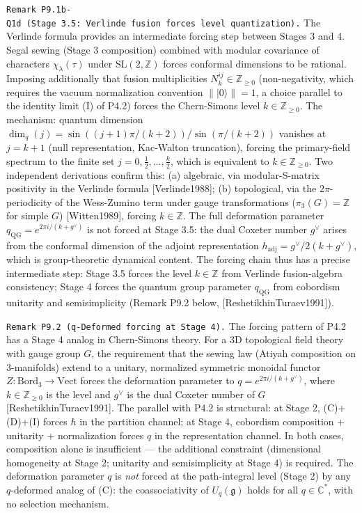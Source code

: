 \documentclass[
]{article}
\begin{document}
\texttt{Remark\ P9.1b-Q1d\ (Stage\ 3.5:\ Verlinde\ fusion\ forces\ level\ quantization).}
The Verlinde formula provides an intermediate forcing step between
Stages 3 and 4. Segal sewing (Stage 3 composition) combined with modular
covariance of characters \(\chi_\lambda(\tau)\) under
\(\mathrm{SL}(2,\mathbb{Z})\) forces conformal dimensions to be
rational. Imposing additionally that fusion multiplicities
\(N^{ij}_k \in \mathbb{Z}_{\geq 0}\) (non-negativity, which requires the
vacuum normalization convention \(\lVert\lvert 0\rangle\rVert = 1\), a
choice parallel to the identity limit (I) of P4.2) forces the
Chern-Simons level \(k \in \mathbb{Z}_{\geq 0}\). The mechanism: quantum
dimension \(\dim_q(j) = \sin((j+1)\pi/(k+2))/\sin(\pi/(k+2))\) vanishes
at \(j = k+1\) (null representation, Kac-Walton truncation), forcing the
primary-field spectrum to the finite set
\(j = 0, \tfrac{1}{2}, \ldots, \tfrac{k}{2}\), which is equivalent to
\(k \in \mathbb{Z}_{\geq 0}\). Two independent derivations confirm this:
(a) algebraic, via modular-S-matrix positivity in the Verlinde formula
{[}Verlinde1988{]}; (b) topological, via the \(2\pi\)-periodicity of the
Wess-Zumino term under gauge transformations (\(\pi_3(G) = \mathbb{Z}\)
for simple \(G\)) {[}Witten1989{]}, forcing \(k \in \mathbb{Z}\). The
full deformation parameter \(q_{\mathrm{QG}} = e^{2\pi i/(k+g^\vee)}\)
is not forced at Stage 3.5: the dual Coxeter number \(g^\vee\) arises
from the conformal dimension of the adjoint representation
\(h_{\mathrm{adj}} = g^\vee / 2(k+g^\vee)\), which is group-theoretic
dynamical content. The forcing chain thus has a precise intermediate
step: Stage 3.5 forces the level \(k \in \mathbb{Z}\) from Verlinde
fusion-algebra consistency; Stage 4 forces the quantum group parameter
\(q_{\mathrm{QG}}\) from cobordism unitarity and semisimplicity (Remark
P9.2 below, {[}ReshetikhinTuraev1991{]}).

\texttt{Remark\ P9.2\ (q-Deformed\ forcing\ at\ Stage\ 4).} The forcing
pattern of P4.2 has a Stage 4 analog in Chern-Simons theory. For a 3D
topological field theory with gauge group \(G\), the requirement that
the sewing law (Atiyah composition on 3-manifolds) extend to a unitary,
normalized symmetric monoidal functor
\(Z\colon \mathrm{Bord}_3 \to \mathrm{Vect}\) forces the deformation
parameter to \(q = e^{2\pi i/(k+g^\vee)}\), where
\(k \in \mathbb{Z}_{\geq 0}\) is the level and \(g^\vee\) is the dual
Coxeter number of \(G\) {[}ReshetikhinTuraev1991{]}. The parallel with
P4.2 is structural: at Stage 2, (C)+(D)+(I) forces \(\hbar\) in the
partition channel; at Stage 4, cobordism composition + unitarity +
normalization forces \(q\) in the representation channel. In both cases,
composition alone is insufficient --- the additional constraint
(dimensional homogeneity at Stage 2; unitarity and semisimplicity at
Stage 4) is required. The deformation parameter \(q\) is \emph{not}
forced at the path-integral level (Stage 2) by any \(q\)-deformed analog
of (C): the coassociativity of \(U_q(\mathfrak{g})\) holds for all
\(q \in \mathbb{C}^*\), with no selection mechanism.
\end{document}
